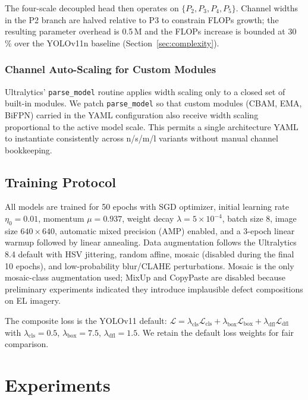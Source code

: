 \documentclass[journal,onecolumn,11pt]{IEEEtran}
\begin{document}
The four-scale decoupled head then operates on $\{P_2, P_3, P_4, P_5\}$. Channel widths in the P2 branch are halved relative to P3 to constrain FLOPs growth; the resulting parameter overhead is 0.5\,M and the FLOPs increase is bounded at 30\,\% over the YOLOv11n baseline (Section~\ref{sec:complexity}).

\subsubsection{Channel Auto-Scaling for Custom Modules}
Ultralytics' \texttt{parse\_model} routine applies width scaling only to a closed set of built-in modules. We patch \texttt{parse\_model} so that custom modules (CBAM, EMA, BiFPN) carried in the YAML configuration also receive width scaling proportional to the active model scale. This permits a single architecture YAML to instantiate consistently across n/s/m/l variants without manual channel bookkeeping.

\subsection{Training Protocol}
\label{sec:training}
All models are trained for 50 epochs with SGD optimizer, initial learning rate $\eta_0=0.01$, momentum $\mu=0.937$, weight decay $\lambda=5\times 10^{-4}$, batch size 8, image size $640 \times 640$, automatic mixed precision (AMP) enabled, and a 3-epoch linear warmup followed by linear annealing. Data augmentation follows the Ultralytics 8.4 default with HSV jittering, random affine, mosaic (disabled during the final 10 epochs), and low-probability blur/CLAHE perturbations. Mosaic is the only mosaic-class augmentation used; MixUp and CopyPaste are disabled because preliminary experiments indicated they introduce implausible defect compositions on EL imagery.

The composite loss is the YOLOv11 default: $\mathcal{L} = \lambda_{\text{cls}}\mathcal{L}_{\text{cls}} + \lambda_{\text{box}}\mathcal{L}_{\text{box}} + \lambda_{\text{dfl}}\mathcal{L}_{\text{dfl}}$ with $\lambda_{\text{cls}}=0.5$, $\lambda_{\text{box}}=7.5$, $\lambda_{\text{dfl}}=1.5$. We retain the default loss weights for fair comparison.

\section{Experiments}
\label{sec:exp}
\end{document}
